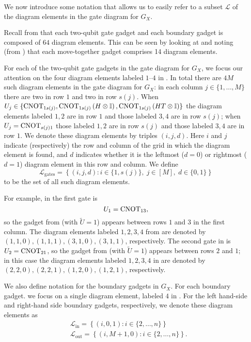 \documentclass[../thesis-main/thesis-main]{subfiles}
\begin{document}
We now introduce some notation that allows us to easily refer to a subset $\mathcal{L}$ of the diagram elements in the gate diagram for $G_X$.

Recall from  that each two-qubit gate gadget and each boundary gadget is composed of $64$ diagram elements. This can be seen by looking at  and noting (from ) that each move-together gadget comprises 14 diagram elements.

For each of the two-qubit gate gadgets in the gate diagram for $G_X$, we focus our attention on the four diagram elements labeled $1$--$4$ in . In total there are $4M$ such diagram elements in the gate diagram for $G_X$: in each column $j\in\{1,\ldots,M\}$ there are two in row $1$ and two in row $s(j)$. When $U_j\in\{\mathrm{CNOT}_{1s(j)},\mathrm{CNOT}_{1s(j)}\left(H\otimes\mathbb{I}\right),\mathrm{CNOT}_{1s(j)}\left(HT\otimes\mathbb{I}\right)\}$ the diagram elements labeled $1,2$ are in row $1$ and those labeled $3,4$ are in row $s(j)$; when $U_j=\mathrm{CNOT}_{s(j) 1}$ those labeled $1,2$ are in row $s(j)$ and those labeled $3,4$ are in row $1$. We denote these diagram elements by triples $(i,j,d)$. Here $i$ and $j$ indicate (respectively) the row and column of the grid in which the diagram element is found, and $d$ indicates whether it is the leftmost ($d=0$) or rightmost ($d=1$) diagram element in this row and column. We define 
\begin{equation}
\mathcal{L}_{\mathrm{gates}}=\left\{ \left(i,j,d\right)\colon i\in\{1,s(j)\},\; j\in[M],\; d\in\{0,1\}\right\} \label{eq:L_gates}
\end{equation}
to be the set of all such diagram elements.

For example, in  the first gate is 
\begin{equation}
  U_1=\mathrm{CNOT}_{13},
\end{equation}
so the gadget from  (with $\tilde U=1$) appears between rows $1$ and $3$ in the first column. The diagram elements labeled $1,2,3,4$ from  are denoted by $(1,1,0), (1,1,1), (3,1,0), (3,1,1)$, respectively. The second gate in  is $U_2=\mathrm{CNOT}_{21}$, so the gadget from  (with $\tilde U=1$) appears between rows $2$ and $1$; in this case the diagram elements labeled $1,2,3,4$ in  are denoted by $(2,2,0),(2,2,1),(1,2,0),(1,2,1)$, respectively.

We also define notation for the boundary gadgets in $G_X$. For each boundary gadget. we focus on a single diagram element, labeled $4$ in . For the left hand-side and right-hand side boundary gadgets, respectively, we denote these diagram elements as
\begin{align}
 & \mathcal{L}_{\text{in}}=\left\{ (i,0,1)\colon i\in\{2,\ldots,n\}\right\} \label{eq:L_in}\\
 & \mathcal{L}_{\text{out}}=\left\{ (i,M+1,0)\colon i\in\{2,\ldots,n\}\right\} .\label{eq:L_out}
\end{align}
 
\end{document}
